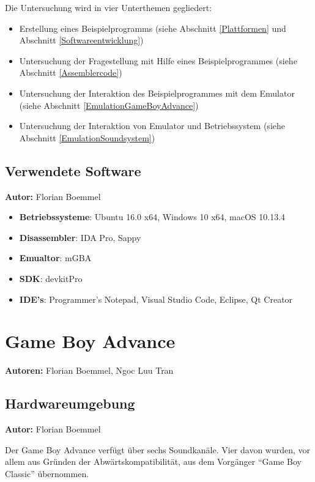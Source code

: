 \documentclass[11pt,a4paper]{scrartcl}
\newcommand{\AutorFlorian} {
    \vspace{-4mm}
    \large \textbf{Autor:} Florian Boemmel \normalsize
    \vspace{2mm}
}
\newcommand{\AutorFlorianNgoc} {
    \vspace{-4mm}
    \large \textbf{Autoren:} Florian Boemmel, Ngoc Luu Tran \normalsize
    \vspace{2mm}
}
\begin{document}
Die Untersuchung wird in vier Unterthemen gegliedert:

\begin{itemize}
    \item Erstellung eines Beispielprogramms (siehe Abschnitt \ref{Plattformen} und Abschnitt \ref{Softwareentwicklung})
    \item Untersuchung der Fragestellung mit Hilfe eines Beispielprogrammes (siehe Abschnitt \ref{Assemblercode})
    \item Untersuchung der Interaktion des Beispielprogrammes mit dem Emulator (siehe Abschnitt \ref{EmulationGameBoyAdvance})
    \item Untersuchung der Interaktion von Emulator und Betriebssystem (siehe Abschnitt \ref{EmulationSoundsystem})
\end{itemize}

\subsection{Verwendete Software}
\AutorFlorian

\begin{itemize}
    \item \textbf{Betriebssysteme}: Ubuntu 16.0 x64, Windows 10 x64, macOS 10.13.4
    \item \textbf{Disassembler}: IDA Pro, Sappy
    \item \textbf{Emualtor}: mGBA
    \item \textbf{SDK}: devkitPro
    \item \textbf{IDE's}: Programmer's Notepad, Visual Studio Code, Eclipse, Qt Creator
\end{itemize}

\newpage


\section{Game Boy Advance} \label{GameBoyAdvance}
\AutorFlorianNgoc

\subsection{Hardwareumgebung} \label{Hardwareumgebung}
\AutorFlorian

Der Game Boy Advance verf\"ugt \"uber sechs Soundkan\"ale. Vier davon wurden, vor allem aus Gr\"unden der Abw\"artskompatibilit\"at, aus dem Vorg\"anger \enquote{Game Boy Classic} \"ubernommen.
\end{document}
